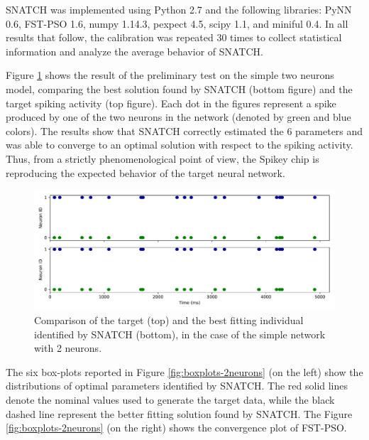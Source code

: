 \documentclass[utf8]{frontiersFPHY} %
\newcommand {\name}{SNATCH}
\begin{document}
\name{} was implemented using Python 2.7 and the following libraries:  PyNN 0.6, FST-PSO 1.6, numpy 1.14.3, pexpect 4.5, scipy 1.1, and miniful 0.4.
In all results that follow, the calibration was repeated 30 times to collect statistical information and analyze the average behavior of \name{}.

Figure \ref{fig:target-2neurons} shows the result of the preliminary test on the simple two neurons model, comparing the best solution found by \name{} (bottom figure) and the target spiking activity (top figure).
Each dot in the figures represent a spike produced by one of the two neurons in the network (denoted by green and blue colors).
The results show that \name{} correctly estimated  the 6 parameters and was able to converge to an optimal solution with respect to the spiking activity.
Thus, from a strictly phenomenological point of view, the Spikey chip is reproducing the expected behavior of the target neural network.

\begin{figure}[!ht]
	\centering
	\includegraphics[width=\textwidth]{images/2-neurons-irregular/target_sim.pdf}
	\caption{Comparison of the target (top) and the best fitting individual identified by \name{} (bottom), in the case of the simple network with 2 neurons.}
	\label{fig:target-2neurons}
\end{figure}

The six box-plots reported in Figure \ref{fig:boxplots-2neurons} (on the left) show the distributions of optimal parameters identified by \name{}.
The red solid lines denote the nominal values used to generate the target data, while the black dashed line represent the better fitting solution found by \name{}. 
The Figure \ref{fig:boxplots-2neurons} (on the right) shows the convergence plot of FST-PSO. 
\end{document}
